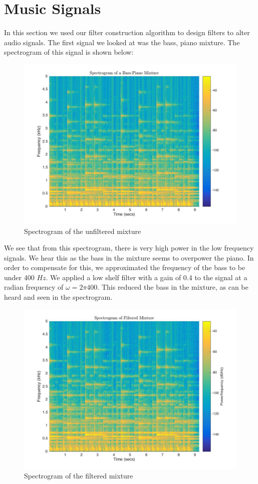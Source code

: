 \documentclass{article}
\begin{document}
\section{Music Signals}
In this section we used our filter construction algorithm to design filters to alter audio signals. The first signal we looked at was the bass, piano mixture. The spectrogram of this signal is shown below:
 \begin{figure}[!htb]
        \centering
        \includegraphics[width=0.6\linewidth, height=0.3\textheight]{specmixture1.jpg}
        \caption{Spectrogram of the unfiltered mixture}
\end{figure}
\FloatBarrier
We see that from this spectrogram, there is very high power in the low frequency signals. We hear this as the bass in the mixture seems to overpower the piano. In order to compensate for this, we approximated the frequency of the bass to be under 400 $\si{Hz}$. We applied a low shelf filter with a gain of 0.4 to the signal at a radian frequency of $\omega = 2\pi 400$. This reduced the bass in the mixture, as can be heard and seen in the spectrogram.

 \begin{figure}[!htb]
        \centering
        \includegraphics[width=0.6\linewidth, height=0.3\textheight]{specmixture2.jpg}
        \caption{Spectrogram of the filtered mixture}
\end{figure}
\end{document}
